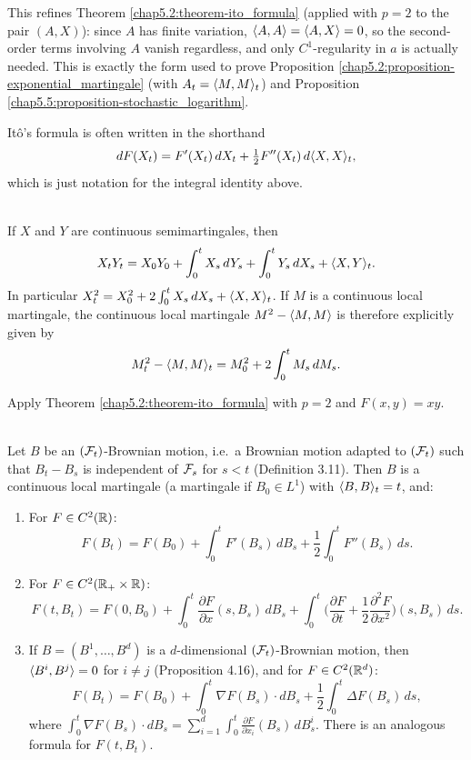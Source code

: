 \begin{remark}
This refines Theorem \ref{chap5.2:theorem-ito_formula} (applied with $p=2$ to the pair $(A,X)$): since $A$ has finite variation, $\langle A,A\rangle=\langle A,X\rangle=0$, so the second-order terms involving $A$ vanish regardless, and only $C^1$-regularity in $a$ is actually needed. This is exactly the form used to prove Proposition \ref{chap5.2:proposition-exponential_martingale} (with $A_t=\langle M,M\rangle_t$) and Proposition \ref{chap5.5:proposition-stochastic_logarithm}.
\end{remark}

\begin{remark}
Itô's formula is often written in the shorthand
$$dF(X_t)=F'(X_t)\,dX_t+\tfrac12F''(X_t)\,d\langle X,X\rangle_t,$$
which is just notation for the integral identity above.
\end{remark}

\begin{corollary}\label{chap5.2:corollary-integration_by_parts}
\\
If $X$ and $Y$ are continuous semimartingales, then
$$X_tY_t=X_0Y_0+\int_0^tX_s\,dY_s+\int_0^tY_s\,dX_s+\langle X,Y\rangle_t.$$
In particular $X_t^2=X_0^2+2\int_0^tX_s\,dX_s+\langle X,X\rangle_t$. If $M$ is a continuous local martingale, the continuous local martingale $M^2-\langle M,M\rangle$ is therefore explicitly given by
$$M_t^2-\langle M,M\rangle_t=M_0^2+2\int_0^tM_s\,dM_s.$$
\end{corollary}

\begin{proofidea}
Apply Theorem \ref{chap5.2:theorem-ito_formula} with $p=2$ and $F(x,y)=xy$.
\end{proofidea}

\begin{corollary}\label{chap5.2:corollary-ito_brownian}
\\
Let $B$ be an $(\mathcal{F}_t)$-Brownian motion, i.e.\ a Brownian motion adapted to $(\mathcal{F}_t)$ such that $B_t-B_s$ is independent of $\mathcal{F}_s$ for $s<t$ (Definition 3.11). Then $B$ is a continuous local martingale (a martingale if $B_0\in L^1$) with $\langle B,B\rangle_t=t$, and:
\begin{enumerate}
    \item For $F\in C^2(\mathbb{R})$:
    $$F(B_t)=F(B_0)+\int_0^tF'(B_s)\,dB_s+\frac12\int_0^tF''(B_s)\,ds.$$
    \item For $F\in C^2(\mathbb{R}_+\times\mathbb{R})$:
    $$F(t,B_t)=F(0,B_0)+\int_0^t\frac{\partial F}{\partial x}(s,B_s)\,dB_s+\int_0^t\Big(\frac{\partial F}{\partial t}+\frac12\frac{\partial^2F}{\partial x^2}\Big)(s,B_s)\,ds.$$
    \item If $B=(B^1,\dots,B^d)$ is a $d$-dimensional $(\mathcal{F}_t)$-Brownian motion, then $\langle B^i,B^j\rangle=0$ for $i\neq j$ (Proposition 4.16), and for $F\in C^2(\mathbb{R}^d)$:
    $$F(B_t)=F(B_0)+\int_0^t\nabla F(B_s)\cdot dB_s+\frac12\int_0^t\Delta F(B_s)\,ds,$$
    where $\int_0^t\nabla F(B_s)\cdot dB_s=\sum_{i=1}^d\int_0^t\frac{\partial F}{\partial x_i}(B_s)\,dB^i_s$. There is an analogous formula for $F(t,B_t)$.
\end{enumerate}
\end{corollary}

